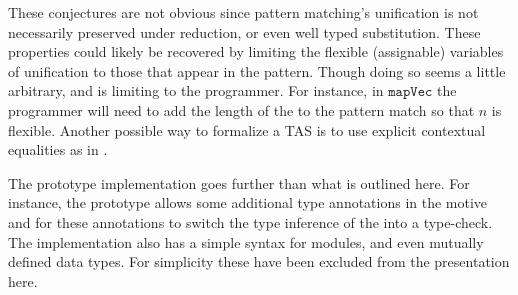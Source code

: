These conjectures are not obvious since pattern matching's unification is not necessarily preserved under reduction, or even well typed substitution.
These properties could likely be recovered by limiting the flexible (assignable) variables of unification to those that appear in the pattern.
Though doing so seems a little arbitrary, and is limiting to the programmer.
For instance, in $\mathtt{mapVec}$ the programmer will need to add the length of the \Vect{} to the pattern match so that $n$ is flexible.
Another possible way to formalize a \ac{TAS} is to use explicit contextual equalities as in \cite{sjoberg2015dependently}.
 
The prototype implementation goes further than what is outlined here.
For instance, the prototype allows some additional type annotations in the motive and for these annotations to switch the type inference of the \scrut{} into a type-check.
The implementation also has a simple syntax for modules, and even mutually defined data types.
For simplicity these have been excluded from the presentation here.
